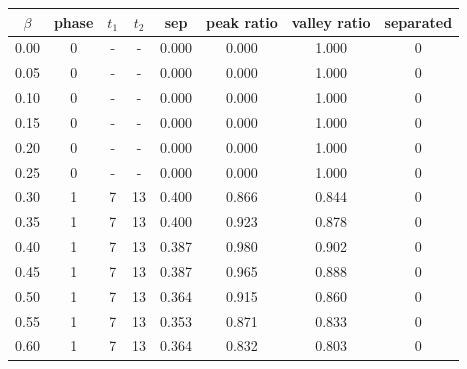 \begin{tabular}{cccccccc}
\toprule
$\beta$ & phase & $t_1$ & $t_2$ & sep & peak ratio & valley ratio & separated \\
\midrule
0.00 & 0 & - & - & 0.000 & 0.000 & 1.000 & 0 \\
0.05 & 0 & - & - & 0.000 & 0.000 & 1.000 & 0 \\
0.10 & 0 & - & - & 0.000 & 0.000 & 1.000 & 0 \\
0.15 & 0 & - & - & 0.000 & 0.000 & 1.000 & 0 \\
0.20 & 0 & - & - & 0.000 & 0.000 & 1.000 & 0 \\
0.25 & 0 & - & - & 0.000 & 0.000 & 1.000 & 0 \\
0.30 & 1 & 7 & 13 & 0.400 & 0.866 & 0.844 & 0 \\
0.35 & 1 & 7 & 13 & 0.400 & 0.923 & 0.878 & 0 \\
0.40 & 1 & 7 & 13 & 0.387 & 0.980 & 0.902 & 0 \\
0.45 & 1 & 7 & 13 & 0.387 & 0.965 & 0.888 & 0 \\
0.50 & 1 & 7 & 13 & 0.364 & 0.915 & 0.860 & 0 \\
0.55 & 1 & 7 & 13 & 0.353 & 0.871 & 0.833 & 0 \\
0.60 & 1 & 7 & 13 & 0.364 & 0.832 & 0.803 & 0 \\
\bottomrule
\end{tabular}